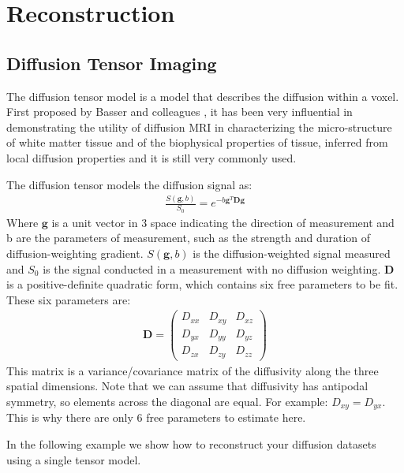 \documentclass{bioinfo}
\begin{document}
\section{Reconstruction}

\subsection{Diffusion Tensor Imaging}

The diffusion tensor model is a model that describes the diffusion within a
voxel. First proposed by Basser and colleagues \citep{basser-mattiello-etal:94}, it has been very
influential in demonstrating the utility of diffusion MRI in characterizing the
micro-structure of white matter tissue and of the biophysical properties of
tissue, inferred from local diffusion properties and it is still very commonly
used.

The diffusion tensor models the diffusion signal as:
\begin{eqnarray*}
\frac{S(\mathbf{g}, b)}{S_0} = e^{-b\mathbf{g}^T \mathbf{D} \mathbf{g}}
\end{eqnarray*}
Where $\mathbf{g}$ is a unit vector in 3 space indicating the direction of
measurement and b are the parameters of measurement, such as the strength and
duration of diffusion-weighting gradient. $S(\mathbf{g}, b)$ is the
diffusion-weighted signal measured and $S_0$ is the signal conducted in a
measurement with no diffusion weighting. $\mathbf{D}$ is a positive-definite quadratic
form, which contains six free parameters to be fit. These six parameters are:
\begin{eqnarray*}
\mathbf{D} = \begin{pmatrix}
D_{xx} & D_{xy} & D_{xz} \\ 
D_{yx} & D_{yy} & D_{yz} \\ 
D_{zx} & D_{zy} & D_{zz}
\end{pmatrix}
\end{eqnarray*}
This matrix is a variance/covariance matrix of the diffusivity along the three
spatial dimensions. Note that we can assume that diffusivity has antipodal
symmetry, so elements across the diagonal are equal. For example:
$D_{xy} = D_{yx}$. This is why there are only 6 free parameters to estimate
here.

In the following example we show how to reconstruct your diffusion datasets
using a single tensor model.
\end{document}
